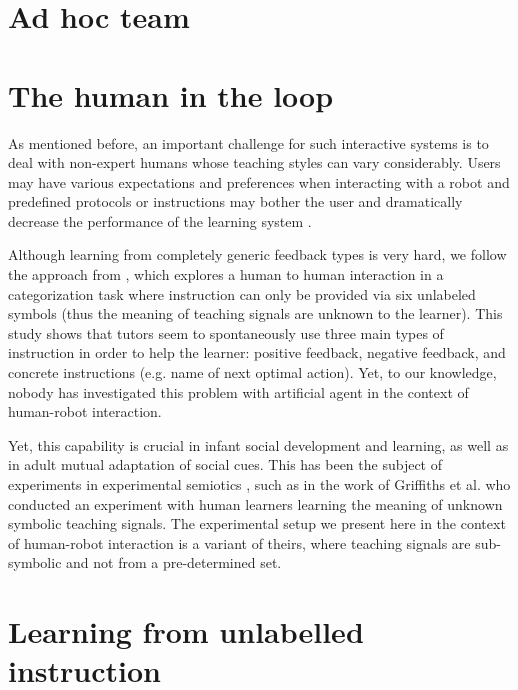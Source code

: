 \section{Ad hoc team}


\section{The human in the loop}
\label{chapter:related:humanintheloop}


As mentioned before, an important challenge for such interactive systems is to deal with non-expert humans whose teaching styles can vary considerably. Users may have various expectations and preferences when interacting with a robot and predefined protocols or instructions may bother the user and dramatically decrease the performance of the learning system \cite{rouanet2013impact}. 

Although learning from completely generic feedback types is very hard, we follow the approach from \cite{griffiths2012bottom}, which explores a human to human interaction in a categorization task where instruction can only be provided via six unlabeled symbols (thus the meaning of teaching signals are unknown to the learner). This study shows that tutors seem to spontaneously use three main types of instruction in order to help the learner: positive feedback, negative feedback, and concrete instructions (e.g. name of next optimal action). Yet, to our knowledge, nobody has investigated this problem with artificial agent in the context of human-robot interaction.


Yet, this capability is crucial in infant social development and learning, as well as in adult mutual adaptation of social cues. This has been the subject of experiments in experimental semiotics \cite{galantucci2009experimental}, such as in the work of Griffiths et al. \cite{griffiths2012bottom} who conducted an experiment with human learners learning the meaning of unknown symbolic teaching signals. The experimental setup we present here in the context of human-robot interaction is a variant of theirs, where teaching signals are sub-symbolic and not from a pre-determined set.


\section{Learning from unlabelled instruction}



